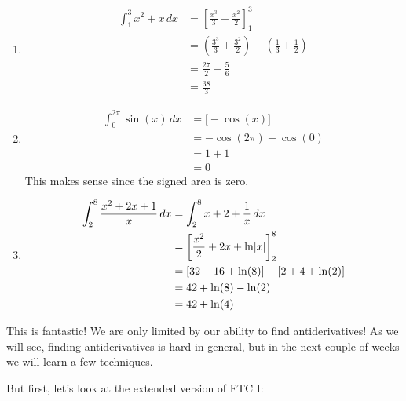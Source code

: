 \begin{Example}{}{}
    \begin{enumerate}[label=(\roman*)]
        \item \begin{align*}
                  \int_{1}^{3} x^2+x\, d{x}
                   & =\left[\frac{x^3}{3}+\frac{x^2}{2}\right]_{1}^3                                      \\
                   & = \left( \frac{3^3}{3} +\frac{3^2}{2} \right)-\left( \frac{1}{3}+\frac{1}{2} \right) \\
                   & =\frac{27}{2} -\frac{5}{6}                                                           \\
                   & =\frac{38}{3}
              \end{align*}
        \item \begin{align*}
                  \int_{0}^{2\pi} \sin(x)\, d{x}
                   & =\bigl[-\cos(x)\bigr] \\
                   & =-\cos(2\pi)+\cos(0)  \\
                   & =1+1                  \\
                   & =0
              \end{align*}
              This makes sense since the signed area is zero.
        \item \begin{align*}
                  \int_{2}^{8} \frac{x^2+2x+1}{x} \, d{x}
                   & =\int_{2}^{8} x+2+\frac{1}{x}\, d{x}              \\
                   & =\left[\frac{x^2}{2} +2x+\ln\lvert x\rvert \right]_{2}^8 \\
                   & =[32+16+\ln(8)]-[2+4+\ln(2)]                      \\
                   & =42+\ln(8)-\ln(2)                                 \\
                   & =42+\ln(4)
              \end{align*}
    \end{enumerate}
\end{Example}

This is fantastic! We are only limited by our ability to find antiderivatives!
As we will see, finding antiderivatives is hard in general, but in the next couple of
weeks we will learn a few techniques.

But first, let's look at the extended version of FTC I\@:

